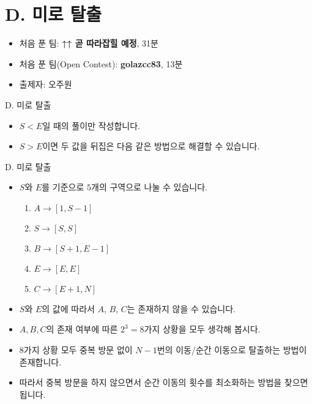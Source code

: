 \def\probno{D}
\def\probtitle{미로 탈출}

\section{\probno{}. \probtitle{}}

\begin{frame} %
    \sectiontitle{\probno{}}{\probtitle{}}
    \begin{itemize}
        \item 처음 푼 팀: \textbf{↑↑ 곧 따라잡힐 예정}, 31분
        \item 처음 푼 팀(Open Contest): \textbf{golazcc83}, 13분
        \item 출제자: 오주원
    \end{itemize}
\end{frame}

\begin{frame}{\probno{}. \probtitle{}}
    \begin{itemize}
        \item $S < E$일 때의 풀이만 작성합니다.
        \item $S > E$이면 두 값을 뒤집은 다음 같은 방법으로 해결할 수 있습니다.
    \end{itemize}
\end{frame}

\begin{frame}{\probno{}. \probtitle{}}
    \begin{itemize}
        \item $S$와 $E$를 기준으로 $5$개의 구역으로 나눌 수 있습니다.
        \begin{enumerate}
            \item $A \rightarrow [1, S-1]$
            \item $S \rightarrow [S, S]$
            \item $B \rightarrow [S+1, E-1]$
            \item $E \rightarrow [E, E]$
            \item $C \rightarrow [E+1, N]$
        \end{enumerate}
        \item $S$와 $E$의 값에 따라서 $A$, $B$, $C$는 존재하지 않을 수 있습니다.
        \item $A, B, C$의 존재 여부에 따른 $2^3=8$가지 상황을 모두 생각해 봅시다.
        \item 8가지 상황 모두 중복 방문 없이 $N-1$번의 이동/순간 이동으로 탈출하는 방법이 존재합니다.
        \item 따라서 중복 방문을 하지 않으면서 순간 이동의 횟수를 최소화하는 방법을 찾으면 됩니다.
    \end{itemize}
\end{frame}


